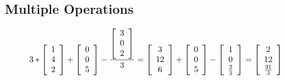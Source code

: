 \documentclass{article}
\begin{document}
\subsection{Multiple Operations}
\[
3
*
\left[\begin{array}[]{c}
    1\\
    4\\
    2
\end{array}\right]
+
\left[\begin{array}[]{c}
    0\\
    0\\
    5
\end{array}\right]
-
\frac{
\left[\begin{array}[]{c}
    3\\
    0\\
    2
\end{array}\right]
}{3}
=
\left[\begin{array}[]{c}
    3\\
    12\\
    6
\end{array}\right]
+
\left[\begin{array}[]{c}
    0\\
    0\\
    5
\end{array}\right]
-
\left[\begin{array}[]{c}
    1\\
    0\\
    \frac{2}{3}
\end{array}\right]
=
\left[\begin{array}[]{c}
    2\\
    12\\
    \frac{31}{3}
\end{array}\right]
\]
\end{document}
